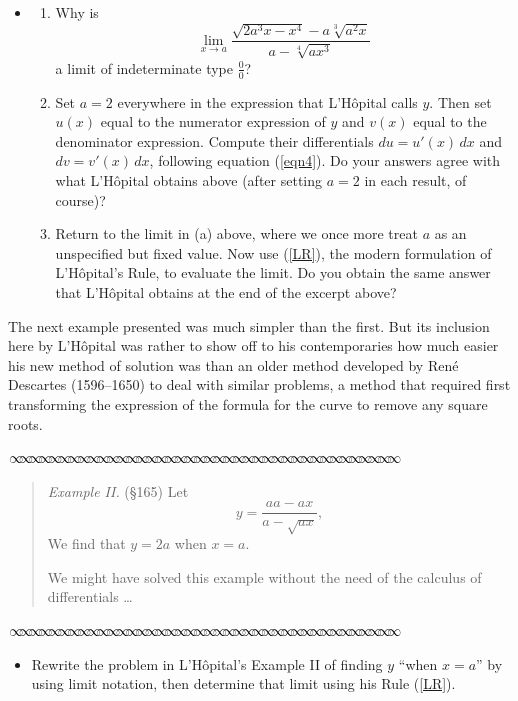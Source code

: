 \message{ !name(LHopitalsRule_2021.03.29.tex)}\documentclass[11pt]{article}
\newcommand{\sep}{\vspace{-3pt}
\begin{center}
{\mathversion{normal}
$\infty \mspace{-5.5mu}\infty \mspace{-5.5mu}\infty \mspace{-5.5mu}\infty \mspace{-5.5mu}
\infty \mspace{-5.5mu}\infty \mspace{-5.5mu}\infty \mspace{-5.5mu}\infty \mspace{-5.5mu}
\infty \mspace{-5.5mu}\infty \mspace{-5.5mu}\infty \mspace{-5.5mu}\infty \mspace{-5.5mu}
\infty \mspace{-5.5mu}\infty \mspace{-5.5mu}\infty \mspace{-5.5mu}\infty \mspace{-5.5mu}
\infty \mspace{-5.5mu}\infty \mspace{-5.5mu}\infty \mspace{-5.5mu}\infty \mspace{-5.5mu}
\infty \mspace{-5.5mu}\infty \mspace{-5.5mu}\infty \mspace{-5.5mu}\infty \mspace{-5.5mu}
\infty \mspace{-5.5mu}\infty \mspace{-5.5mu}\infty \mspace{-5.5mu}\infty \mspace{-5.5mu}
\infty \mspace{-5.5mu}\infty \mspace{-5.5mu}\infty \mspace{-5.5mu}\infty \mspace{-5.5mu}
\infty \mspace{-5.5mu}\infty \mspace{-5.5mu}\infty \mspace{-5.5mu}\infty \mspace{-5.5mu}
\infty \mspace{-5.5mu}\infty \mspace{-5.5mu}\infty \mspace{-5.5mu}\infty \mspace{-5.5mu}$}
\end{center} \vspace*{-5pt}}
\newenvironment{source}%
 {\bigskip \sep \vspace*{-6pt} \begin{quote}
          \begin{sf}   }
   {   \end{sf}     \end{quote} \vspace*{-6pt} \sep \bigskip}%
\newcounter{tasknumb}
\newcommand{\tasknumb}[1]{\refstepcounter{tasknumb}\textmd{\textbf{$\fbox{$\fbox{Task \thetasknumb}$}$}}#1}
\newenvironment{task}[1][]%
 {\begin{itemize}
 \item[\tasknumb{#1}] }
{
    \end{itemize}    }%
\begin{document}
\begin{task}[\label{ex1}]
\begin{enumerate}
\item[(a)] Why is $$\lim_{x\to a} \frac{\sqrt{2a^3x-x^4}-a\sqrt[3]{a^2x}}{a-\sqrt[4]{ax^3}}$$a limit of indeterminate type $\frac00$? \\
\item[(b)] Set $a=2$ everywhere in the expression that L'H\^opital calls $y$. Then set $u(x)$ equal to the numerator expression of $y$ and $v(x)$ equal to the denominator expression. Compute their differentials $du=u'(x)\,dx$ and $dv=v'(x)\,dx$, following equation (\ref{eqn4}). Do your answers agree with what L'H\^opital obtains above (after setting $a=2$ in each result, of course)? \\
\item[(c)] Return to the limit in (a) above, where we once more treat $a$ as an unspecified but fixed value. Now use (\ref{LR}), the modern formulation of L'H\^opital's Rule, to evaluate the limit. Do you obtain the same answer that L'H\^opital obtains at the end of the excerpt above?
\end{enumerate}

\end{task}

\bigskip
The next example presented was much simpler than the first. But its inclusion here by L'H\^opital was rather to show off to his contemporaries how much easier his new method of solution was than an older method developed by Ren\'e Descartes (1596--1650) to deal with similar problems, a method that required first transforming the expression of the formula for the curve to remove any square roots.

\begin{source}
\emph{Example II.} (\S 165) Let $$y=\frac{aa-ax}{a-\sqrt{ax}},$$We find that $y=2a$ when $x=a$. 

We might have solved this example without the need of the calculus of differentials \dots


\end{source}

\begin{task}[\label{ex2}]
Rewrite the problem in L'H\^opital's {\sf Example II} of finding $y$ ``{\sf when} $x=a$'' by using limit notation, then determine that limit using his Rule (\ref{LR}).

\end{task}
\end{document}
